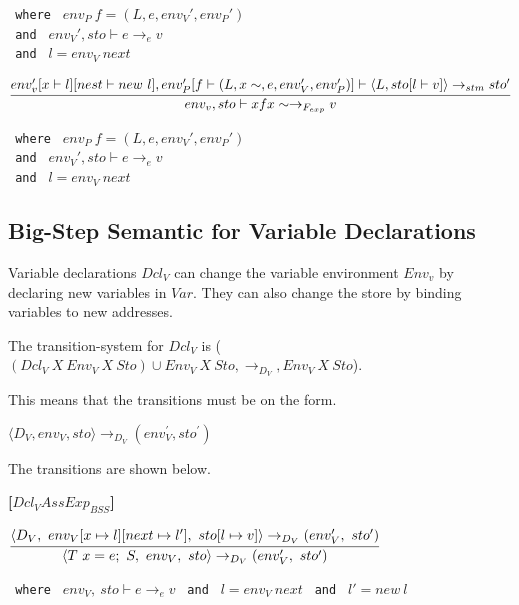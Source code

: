 {\begin{center}
	\texttt{ where } $env_P\ f = (L, e, env_V', env_P')$\\
	\texttt{ and } $ env_V', sto \vdash e \rightarrow_{e} v$\\
	\texttt{ and } $l = env_V\ next$
\end{center}

\begin{center}
	\begin{math}
	\cfrac
	{env_v'[x \vdash l][nest \vdash new\ l], env_P'[f \vdash (L, x\sim, e, env_V', env_P')] \vdash \langle L, sto[l \vdash v] \rangle \rightarrow_{stm} sto'}
	{env_v, sto \vdash x f x\sim \rightarrow_{F_{exp}} v}
	\end{math}
	
	\texttt{ where } $env_P\ f = (L, e, env_V', env_P')$\\
	\texttt{ and } $ env_V', sto \vdash e \rightarrow_{e} v$\\
	\texttt{ and } $l = env_V\ next$
\end{center}

\subsection{Big-Step Semantic for Variable Declarations}
Variable declarations $Dcl_V$ can change the variable environment $Env_v$ by declaring new variables in $Var$.
They can also change the store by binding variables to new addresses.

The transition-system for $Dcl_V$ is ($(Dcl_V\ X\ Env_V\ X\ Sto) \cup Env_V\ X\ Sto, \rightarrow_{D_{V}}, Env_V\ X\ Sto$).

This means that the transitions must be on the form.

\begin{center}
	$\langle D_V,env_V,sto \rangle \rightarrow_{D_V} (env_V^{'} , sto^{'})$
\end{center}

The transitions are shown below.

\textbf{[$Dcl_VAssExp_{BSS}$]}\\
\begin{center}
	\begin{math}
	\cfrac
		{\langle D_V,\ env_V[x \mapsto l][next \mapsto l'],\ sto[l \mapsto v] \rangle \rightarrow_{D_V} (env_V',\ sto')}
		{\langle T\ x = e;\ S,\ env_V,\ sto \rangle \rightarrow_{D_V} (env_V',\ sto')}
	\end{math}
	
	\texttt{ where } $env_V,\ sto \vdash e \rightarrow_e v$
	\texttt{ and } $l = env_V\ next$
	\texttt{ and } $l' = new\ l$
\end{center}

}
